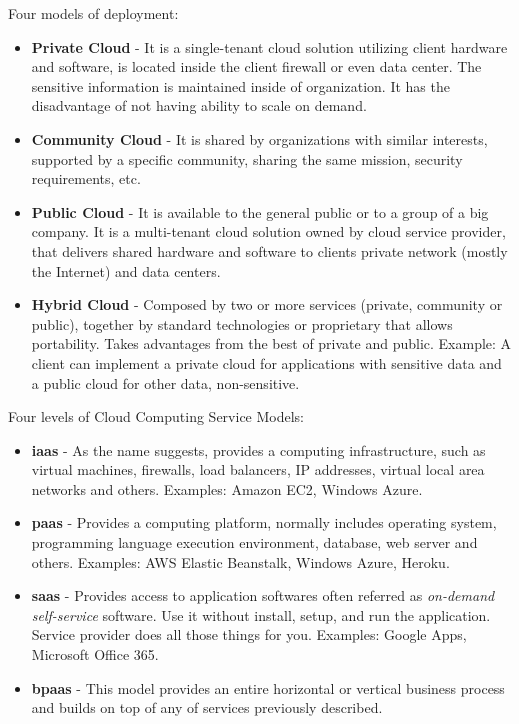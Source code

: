 Four models of deployment:
\begin{itemize}
	\item \textbf{Private Cloud}   - It is a single-tenant cloud solution utilizing client hardware and software, is located inside the client firewall or even data center. The sensitive information is maintained inside of organization. It has the disadvantage of not having ability to scale on demand.

	\item \textbf{Community Cloud} - It is shared by organizations with similar interests, supported by a specific community, sharing the same mission, security requirements, etc.

	\item \textbf{Public Cloud}    - It is available to the general public or to a group of a big company. It is a multi-tenant cloud solution owned by cloud service provider, that delivers shared hardware and software to clients private network (mostly the Internet) and data centers.

	\item \textbf{Hybrid Cloud}    - Composed by two or more services (private, community or public), together by standard technologies or proprietary that allows portability. Takes advantages from the best of private and public. Example: A client can implement a private cloud for applications with sensitive data and a public cloud for other data, non-sensitive.
\end{itemize}

Four levels of Cloud Computing Service Models:

\begin{itemize}
	\item \textbf{\acl{iaas}} - As the name suggests, provides a computing infrastructure, such as virtual machines, firewalls, load balancers, IP addresses, virtual local area networks and others. Examples: Amazon EC2, Windows Azure.

	\item \textbf{\acl{paas}} - Provides a computing platform, normally includes operating system, programming language execution environment, database, web server and others. Examples: AWS Elastic Beanstalk, Windows Azure, Heroku.

	\item \textbf{\acl{saas}} - Provides access to application softwares often referred as \textit{on-demand self-service} software. Use it without install, setup, and run the application. Service provider does all those things for you. Examples: Google Apps, Microsoft Office 365.

	\item \textbf{\acl{bpaas}} - This model provides an entire horizontal or vertical business process and builds on top of any of services previously described.

\end{itemize}

